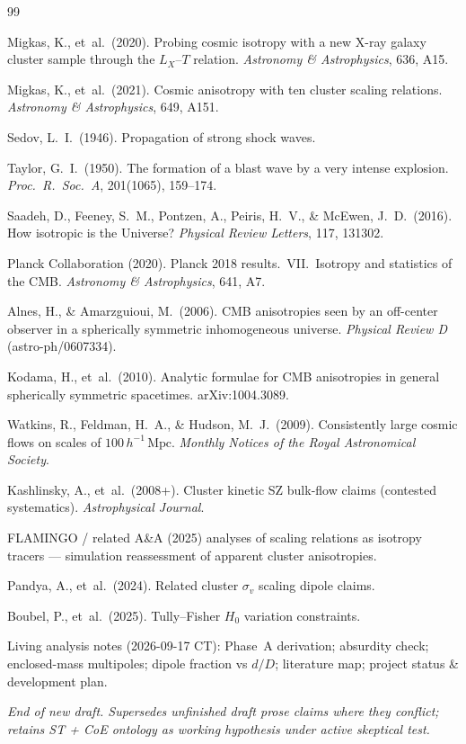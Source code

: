 \documentclass[11pt,a4paper]{article}
\begin{document}
\begin{thebibliography}{99}

Migkas, K., et~al.\ (2020).
Probing cosmic isotropy with a new X-ray galaxy cluster sample through the \(L_X\)--\(T\) relation.
\textit{Astronomy \& Astrophysics}, 636, A15.

Migkas, K., et~al.\ (2021).
Cosmic anisotropy with ten cluster scaling relations.
\textit{Astronomy \& Astrophysics}, 649, A151.

Sedov, L.~I.\ (1946).
Propagation of strong shock waves.

Taylor, G.~I.\ (1950).
The formation of a blast wave by a very intense explosion.
\textit{Proc.\ R.\ Soc.\ A}, 201(1065), 159--174.

Saadeh, D., Feeney, S.~M., Pontzen, A., Peiris, H.~V., \& McEwen, J.~D.\ (2016).
How isotropic is the Universe?
\textit{Physical Review Letters}, 117, 131302.

Planck Collaboration (2020).
Planck 2018 results.\ VII.\ Isotropy and statistics of the CMB.
\textit{Astronomy \& Astrophysics}, 641, A7.

Alnes, H., \& Amarzguioui, M.\ (2006).
CMB anisotropies seen by an off-center observer in a spherically symmetric inhomogeneous universe.
\textit{Physical Review D} (astro-ph/0607334).

Kodama, H., et~al.\ (2010).
Analytic formulae for CMB anisotropies in general spherically symmetric spacetimes.
arXiv:1004.3089.

Watkins, R., Feldman, H.~A., \& Hudson, M.~J.\ (2009).
Consistently large cosmic flows on scales of \(100\,h^{-1}\,\mathrm{Mpc}\).
\textit{Monthly Notices of the Royal Astronomical Society}.

Kashlinsky, A., et~al.\ (2008+).
Cluster kinetic SZ bulk-flow claims (contested systematics).
\textit{Astrophysical Journal}.

FLAMINGO / related A\&A (2025) analyses of scaling relations as isotropy tracers --- simulation reassessment of apparent cluster anisotropies.

Pandya, A., et~al.\ (2024).
Related cluster \(\sigma_v\) scaling dipole claims.

Boubel, P., et~al.\ (2025).
Tully--Fisher \(H_0\) variation constraints.

Living analysis notes (2026-09-17 CT): Phase~A derivation; absurdity check; enclosed-mass multipoles; dipole fraction vs \(d/D\); literature map; project status \& development plan.

\end{thebibliography}

\noindent\textit{End of new draft. Supersedes unfinished draft prose claims where they conflict; retains ST + CoE ontology as working hypothesis under active skeptical test.}
\end{document}
